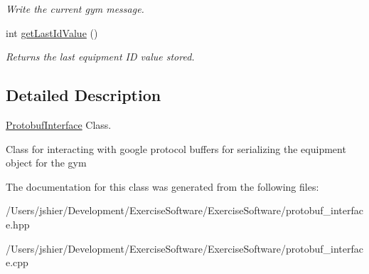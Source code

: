 \begin{DoxyCompactItemize}
\begin{DoxyCompactList}\small\item\em Write the current gym message. \end{DoxyCompactList}\item 
\hypertarget{class_protobuf_interface_ae6a038c87ee785121c4205d461f2d26b}{}int \hyperlink{class_protobuf_interface_ae6a038c87ee785121c4205d461f2d26b}{get\+Last\+Id\+Value} ()\label{class_protobuf_interface_ae6a038c87ee785121c4205d461f2d26b}

\begin{DoxyCompactList}\small\item\em Returns the last equipment I\+D value stored. \end{DoxyCompactList}\end{DoxyCompactItemize}


\subsection{Detailed Description}
\hyperlink{class_protobuf_interface}{Protobuf\+Interface} Class. 

Class for interacting with google protocol buffers for serializing the equipment object for the gym 

The documentation for this class was generated from the following files\+:\begin{DoxyCompactItemize}
\item 
/\+Users/jshier/\+Development/\+Exercise\+Software/\+Exercise\+Software/protobuf\+\_\+interface.\+hpp\item 
/\+Users/jshier/\+Development/\+Exercise\+Software/\+Exercise\+Software/protobuf\+\_\+interface.\+cpp\end{DoxyCompactItemize}
